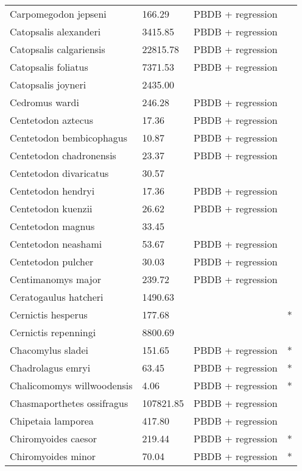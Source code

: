 \documentclass{article}
\begin{document}
\begin{center}
\begin{longtable}{p{} p{} p{} p{}}
    Carpomegodon jepseni & 166.29 & PBDB + regression &  \\ 
    Catopsalis alexanderi & 3415.85 & PBDB + regression &  \\ 
    Catopsalis calgariensis & 22815.78 & PBDB + regression &  \\ 
    Catopsalis foliatus & 7371.53 & PBDB + regression &  \\ 
    Catopsalis joyneri & 2435.00 & \cite{Wilson2012} &  \\ 
    Cedromus wardi & 246.28 & PBDB + regression &  \\ 
    Centetodon aztecus & 17.36 & PBDB + regression &  \\ 
    Centetodon bembicophagus & 10.87 & PBDB + regression &  \\ 
    Centetodon chadronensis & 23.37 & PBDB + regression &  \\ 
    Centetodon divaricatus & 30.57 & \cite{Tomiya2013} &  \\ 
    Centetodon hendryi & 17.36 & PBDB + regression &  \\ 
    Centetodon kuenzii & 26.62 & PBDB + regression &  \\ 
    Centetodon magnus & 33.45 & \cite{Tomiya2013} &  \\ 
    Centetodon neashami & 53.67 & PBDB + regression &  \\ 
    Centetodon pulcher & 30.03 & PBDB + regression &  \\ 
    Centimanomys major & 239.72 & PBDB + regression &  \\ 
    Ceratogaulus hatcheri & 1490.63 & \cite{Cassiliano2008} &  \\ 
    Cernictis hesperus & 177.68 & \cite{Tomiya2013} & * \\ 
    Cernictis repenningi & 8800.69 & \cite{Hall1930} &  \\ 
    Chacomylus sladei & 151.65 & PBDB + regression & * \\ 
    Chadrolagus emryi & 63.45 & PBDB + regression & * \\ 
    Chalicomomys willwoodensis & 4.06 & PBDB + regression & * \\ 
    Chasmaporthetes ossifragus & 107821.85 & PBDB + regression &  \\ 
    Chipetaia lamporea & 417.80 & PBDB + regression &  \\ 
    Chiromyoides caesor & 219.44 & PBDB + regression & * \\ 
    Chiromyoides minor & 70.04 & PBDB + regression & * \\ 

\end{longtable}
\end{center}
\end{document}
